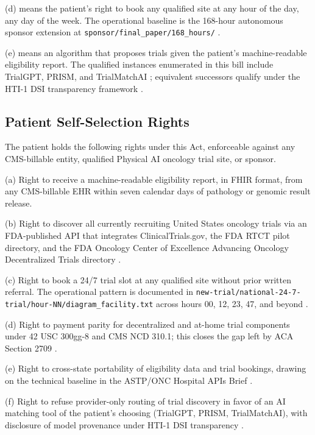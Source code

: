(d)  means the patient's right to book any
qualified site at any hour of the day, any day of the week. The
operational baseline is the 168-hour autonomous sponsor extension at
\texttt{sponsor/final\_paper/168\_hours/} \cite{kawchak_2026_19396256}.

(e)  means an algorithm that proposes
trials given the patient's machine-readable eligibility report. The
qualified instances enumerated in this bill include TrialGPT, PRISM,
and TrialMatchAI \cite{jin2024trialgpt, gupta2024prism,
abdallah2026trialmatchai}; equivalent successors qualify under the
HTI-1 DSI transparency framework \cite{hti1_dsi_fact_sheet_2023}.

\subsection{Patient Self-Selection Rights}

The patient holds the following rights under this Act, enforceable
against any CMS-billable entity, qualified Physical AI oncology trial
site, or sponsor.

(a) Right to receive a machine-readable eligibility report, in FHIR
format, from any CMS-billable EHR within seven calendar days of
pathology or genomic result release.

(b) Right to discover all currently recruiting United States oncology
trials via an FDA-published API that integrates ClinicalTrials.gov,
the FDA RTCT pilot directory, and the FDA Oncology Center of
Excellence Advancing Oncology Decentralized Trials directory
\cite{fda_oce_advancing_oncology_dct_2024, fda_rtct_press_2026}.

(c) Right to book a 24/7 trial slot at any qualified site without
prior written referral. The operational pattern is documented in
\texttt{new-trial/national-24-7-trial/hour-NN/diagram\_facility.txt}
across hours 00, 12, 23, 47, and beyond \cite{kawchak_2026_19994945}.

(d) Right to payment parity for decentralized and at-home trial
components under 42 USC 300gg-8 and CMS NCD 310.1; this closes the
gap left by ACA Section 2709 \cite{usc_300gg8_clinical_trials,
cms_ncd_3101_routine_costs}.

(e) Right to cross-state portability of eligibility data and trial
bookings, drawing on the technical baseline in the ASTP/ONC Hospital
APIs Brief \cite{astp_onc_hospital_apis_2024}.

(f) Right to refuse provider-only routing of trial discovery in
favor of an AI matching tool of the patient's choosing (TrialGPT,
PRISM, TrialMatchAI), with disclosure of model provenance under
HTI-1 DSI transparency \cite{hti1_dsi_fact_sheet_2023}.

